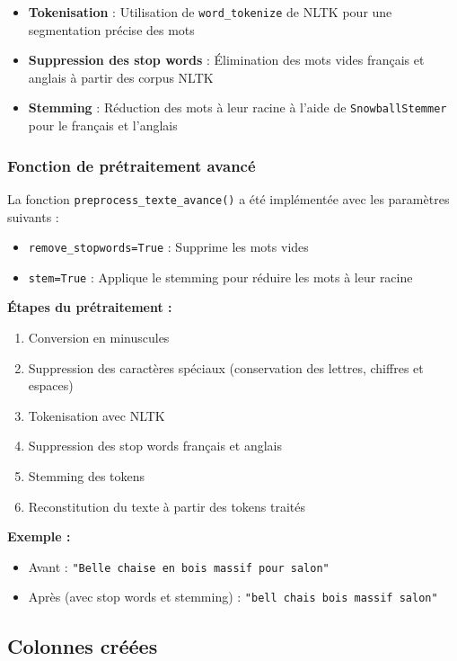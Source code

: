 \documentclass[12pt,a4paper]{article}
\begin{document}
\begin{itemize}
    \item \textbf{Tokenisation} : Utilisation de \texttt{word\_tokenize} de NLTK pour une segmentation précise des mots
    \item \textbf{Suppression des stop words} : Élimination des mots vides français et anglais à partir des corpus NLTK
    \item \textbf{Stemming} : Réduction des mots à leur racine à l'aide de \texttt{SnowballStemmer} pour le français et l'anglais
\end{itemize}

\subsubsection{Fonction de prétraitement avancé}

La fonction \texttt{preprocess\_texte\_avance()} a été implémentée avec les paramètres suivants :

\begin{itemize}
    \item \texttt{remove\_stopwords=True} : Supprime les mots vides
    \item \texttt{stem=True} : Applique le stemming pour réduire les mots à leur racine
\end{itemize}

\textbf{Étapes du prétraitement :}
\begin{enumerate}
    \item Conversion en minuscules
    \item Suppression des caractères spéciaux (conservation des lettres, chiffres et espaces)
    \item Tokenisation avec NLTK
    \item Suppression des stop words français et anglais
    \item Stemming des tokens
    \item Reconstitution du texte à partir des tokens traités
\end{enumerate}

\textbf{Exemple :}
\begin{itemize}
    \item Avant : \texttt{"Belle chaise en bois massif pour salon"}
    \item Après (avec stop words et stemming) : \texttt{"bell chais bois massif salon"}
\end{itemize}

\subsection{Colonnes créées}
\end{document}

